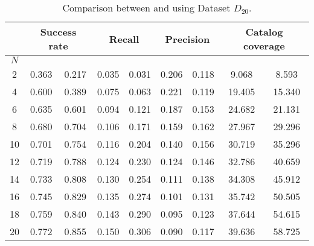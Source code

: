 \begin{table*}[t!]
	\normalsize
	\caption{Comparison between \MNB and \TFb using Dataset $D_{20}$.}
	\begin{tabular}{|c| c|c| c|c |c|c |c|c|} \hline		
		& \multicolumn{2}{c|}{\textbf{Success rate}} & \multicolumn{2}{c|}{\textbf{Recall}} & \multicolumn{2}{c|}{\textbf{Precision}} & \multicolumn{2}{c|}{ \textbf{Catalog coverage}} \\ \hline
		$N$  & \MNB     & \TF  & \MNB      & \TF   & \MNB       & \TF    & \MNB       & \TF      \\ \hline         
		
		2  & 0.363      & 0.217  & 0.035     & 0.031  & 0.206       & 0.118   & 9.068          & 8.593      \\ \hline		
		4  & 0.600      & 0.389  & 0.075     & 0.063  & 0.221       & 0.119   & 19.405         & 15.340     \\ \hline
		6  & 0.635      & 0.601  & 0.094     & 0.121  & 0.187       & 0.153   & 24.682         & 21.131     \\ \hline
		\rowcolor{Gray}
		8  & 0.680      & 0.704  & 0.106      & 0.171  & 0.159        & 0.162   & 27.967       & 29.296     \\ \hline
		10 & 0.701      & 0.754  & 0.116      & 0.204  & 0.140        & 0.156   & 30.719       & 35.296  \\ \hline		
		12 & 0.719      & 0.788  & 0.124      & 0.230  & 0.124        & 0.146   & 32.786       & 40.659     \\ \hline		
		14 & 0.733      & 0.808  & 0.130      & 0.254  & 0.111        & 0.138   & 34.308       & 45.912     \\ \hline		
		16 & 0.745      & 0.829  & 0.135      & 0.274  &  0.101       & 0.131   & 35.742       & 50.505     \\ \hline		
		18 & 0.759      & 0.840  & 0.143      & 0.290  & 0.095        & 0.123   & 37.644       & 54.615     \\ \hline
		20 & 0.772      & 0.855 & 0.150       & 0.306  & 0.090        & 0.117   & 39.636       & 58.725    \\ \hline
	\end{tabular}
	\vspace{.2cm}
	\label{tab:combined_dt20}
\end{table*}